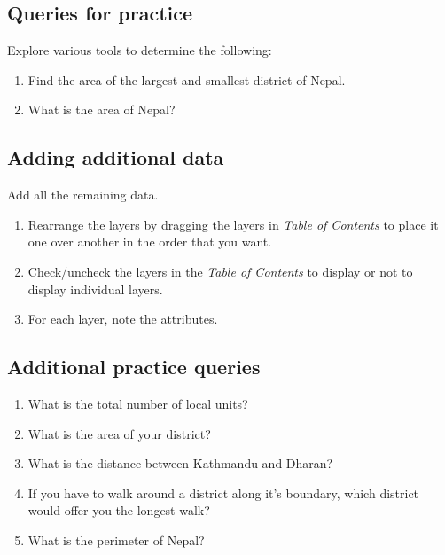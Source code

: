 \subsection{Queries for practice}
Explore various tools to determine the following:
\begin{enumerate}
	\item{Find the area of the largest and smallest district of Nepal.}
	\item{What is the area of Nepal?}
\end{enumerate}

\subsection{Adding additional data}
Add all the remaining data.
\begin{enumerate}
	\item{Rearrange the layers by dragging the layers in \emph{Table of Contents} to place it one over another in the order that you want.}
	\item{Check/uncheck the layers in the \emph{Table of Contents} to display or not to display individual layers.}
	\item{For each layer, note the attributes.}
\end{enumerate}

\subsection{Additional practice queries}
\begin{enumerate}
	\item{What is the total number of local units?}
	\item{What is the area of your district?}
	\item{What is the distance between Kathmandu and Dharan?}
	\item{If you have to walk around a district along it's boundary, which district would offer you the longest walk?}
	\item{What is the perimeter of Nepal?}
\end{enumerate}










